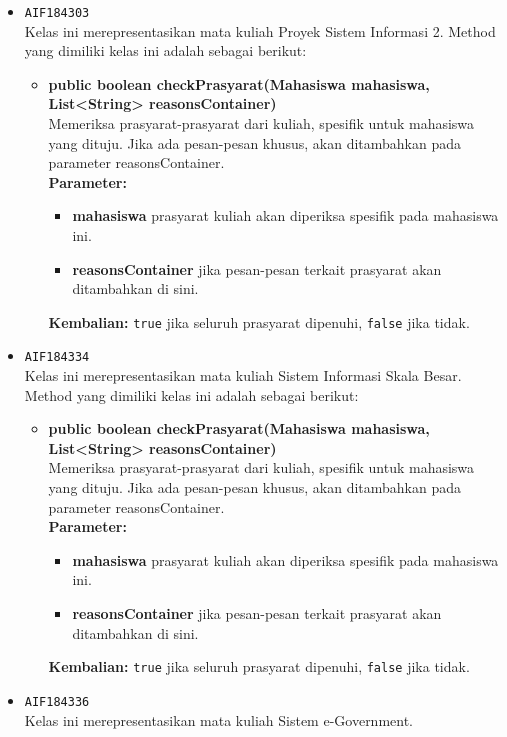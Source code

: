 \begin{enumerate}
\begin{itemize}
\begin{itemize}
\end{itemize}
\item \texttt{AIF184303} \\
Kelas ini merepresentasikan mata kuliah Proyek Sistem Informasi 2. Method yang dimiliki kelas ini adalah sebagai berikut: 
\begin{itemize}
\item \textbf{public boolean checkPrasyarat(Mahasiswa mahasiswa, List<String> reasonsContainer)}\\
Memeriksa prasyarat-prasyarat dari kuliah, spesifik untuk mahasiswa yang dituju. Jika ada pesan-pesan khusus, akan ditambahkan pada parameter reasonsContainer.\\
\textbf{Parameter:}
\begin{itemize}
\item \textbf{mahasiswa} prasyarat kuliah akan diperiksa spesifik pada mahasiswa ini.
\item \textbf{reasonsContainer} jika pesan-pesan terkait prasyarat akan ditambahkan di sini.
\end{itemize}
\textbf{Kembalian:} \texttt{true} jika seluruh prasyarat dipenuhi, \texttt{false} jika tidak.
\end{itemize}
\item \texttt{AIF184334} \\
Kelas ini merepresentasikan mata kuliah Sistem Informasi Skala Besar. Method yang dimiliki kelas ini adalah sebagai berikut: 
\begin{itemize}
\item \textbf{public boolean checkPrasyarat(Mahasiswa mahasiswa, List<String> reasonsContainer)}\\
Memeriksa prasyarat-prasyarat dari kuliah, spesifik untuk mahasiswa yang dituju. Jika ada pesan-pesan khusus, akan ditambahkan pada parameter reasonsContainer.\\
\textbf{Parameter:}
\begin{itemize}
\item \textbf{mahasiswa} prasyarat kuliah akan diperiksa spesifik pada mahasiswa ini.
\item \textbf{reasonsContainer} jika pesan-pesan terkait prasyarat akan ditambahkan di sini.
\end{itemize}
\textbf{Kembalian:} \texttt{true} jika seluruh prasyarat dipenuhi, \texttt{false} jika tidak.
\end{itemize}
\item \texttt{AIF184336} \\
Kelas ini merepresentasikan mata kuliah Sistem e-Government.

\end{itemize}
\end{enumerate}
